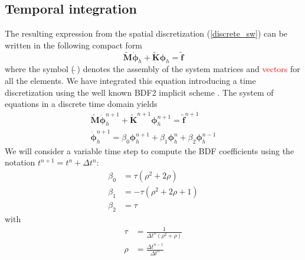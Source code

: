 \documentclass[a4paper,12pt]{elsarticle}
\newcommand{\Miguel}[1]{\textcolor{red}{#1}}
\begin{document}
\subsection{Temporal integration}

The resulting expression from the spatial discretization (\ref{discrete_sw}) can be written in the following compact form 
\begin{equation} \label{discrete_compact}
\tilde{\mathbf{M}}\dot{\bm{\phi}}_h + \tilde{\mathbf{K}}\bm{\phi}_h = \tilde{\mathbf{f}}
\end{equation}
where the symbol ($\,\tilde{}\,$) denotes the assembly of the system matrices and \Miguel{vectors} for all the elements.
We have integrated this equation introducing a time discretization using the well known BDF2 implicit scheme \cite{curtiss1952,brayton1972}. The system of equations in a discrete time domain yields
\begin{equation}
\begin{split} \label{discrete_bdf2}
\tilde{\mathbf{M}}\dot{\bm{\phi}}_h^{n+1} + \tilde{\mathbf{K}}^{n+1}\bm{\phi}_h^{n+1} = \tilde{\mathbf{f}}^{n+1} \\
\dot{\bm{\phi}}_h^{n+1} = \beta_0 \bm{\phi}_h^{n+1} + \beta_1 \bm{\phi}_h^n + \beta_2 \bm{\phi}_h^{n-1}
\end{split}
\end{equation}
We will consider a variable time step to compute the BDF coefficients using the notation $t^{n+1} = t^n + \Delta t^n$:
\begin{equation}
\begin{split}
\beta_0 &= \tau (\rho^2 + 2\rho) \\
\beta_1 &= -\tau (\rho^2 + 2\rho + 1) \\
\beta_2 &= \tau
\end{split}
\end{equation}
with
\begin{equation}
\begin{split}
\tau &= \frac{1}{\Delta t^n(\rho^2 + \rho)} \\
\rho &= \frac{\Delta t^{n-1}}{\Delta t^n}
\end{split}
\end{equation}
\end{document}

